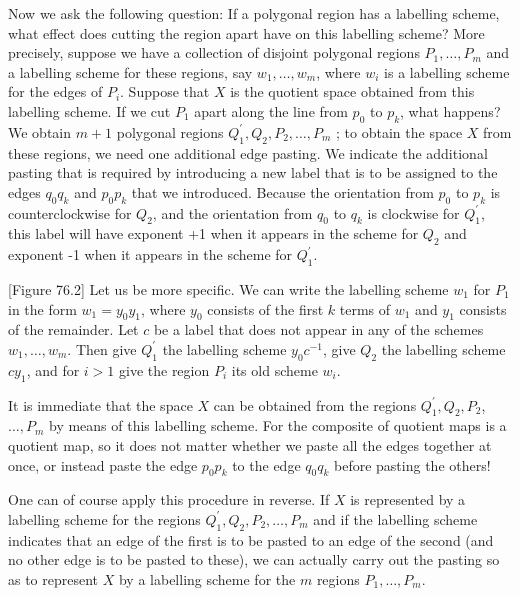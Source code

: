 Now we ask the following question: If a polygonal region has a labelling scheme, what effect does cutting the region apart have on this labelling scheme? More precisely, suppose we have a collection of disjoint polygonal regions \(P_{1},\ldots ,P_{m}\) and a labelling scheme for these regions, say \(w_{1},\ldots ,w_{m}\), where \(w_{i}\) is a labelling scheme for the edges of \(P_{i}\). Suppose that \(X\) is the quotient space obtained from this labelling scheme. If we cut \(P_{1}\) apart along the line from \(p_{0}\) to \(p_{k}\), what happens? We obtain \(m + 1\) polygonal regions \(Q_1^{\prime },Q_{2},P_{2},\ldots ,P_{m}\) ; to obtain the space \(X\) from these regions, we need one additional edge pasting. We indicate the additional pasting that is required by introducing a new label that is to be assigned to the edges \(q_{0}q_{k}\) and \(p_{0}p_{k}\) that we introduced. Because the orientation from \(p_{0}\) to \(p_{k}\) is counterclockwise for \(Q_{2}\), and the orientation from \(q_{0}\) to \(q_{k}\) is clockwise for \(Q_1^{\prime }\), this label will have exponent +1 when it appears in the scheme for \(Q_{2}\) and exponent -1 when it appears in the scheme for \(Q_1^{\prime }\).

[Figure 76.2]
Let us be more specific. We can write the labelling scheme \(w_{1}\) for \(P_{1}\) in the form \(w_{1} = y_{0}y_{1}\), where \(y_{0}\) consists of the first \(k\) terms of \(w_{1}\) and \(y_{1}\) consists of the remainder. Let \(c\) be a label that does not appear in any of the schemes \(w_{1},\ldots ,w_{m}\). Then give \(Q_1^{\prime }\) the labelling scheme \(y_{0}c^{-1}\), give \(Q_{2}\) the labelling scheme \(cy_{1}\), and for \(i > 1\) give the region \(P_{i}\) its old scheme \(w_{i}\).

It is immediate that the space \(X\) can be obtained from the regions \(Q_1^{\prime },Q_{2},P_{2}\), \(\ldots ,P_{m}\) by means of this labelling scheme. For the composite of quotient maps is a quotient map, so it does not matter whether we paste all the edges together at once, or instead paste the edge \(p_{0}p_{k}\) to the edge \(q_{0}q_{k}\) before pasting the others!

One can of course apply this procedure in reverse. If \(X\) is represented by a labelling scheme for the regions \(Q_1^{\prime },Q_{2},P_{2},\ldots ,P_{m}\) and if the labelling scheme indicates that an edge of the first is to be pasted to an edge of the second (and no other edge is to be pasted to these), we can actually carry out the pasting so as to represent \(X\) by a labelling scheme for the \(m\) regions \(P_{1},\ldots ,P_{m}\).

